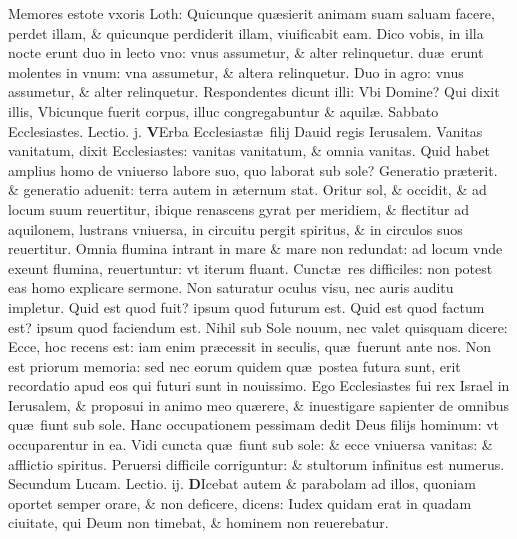 \documentclass[a5paper,10pt]{book}
\def\leftmarginnote{%
	\lrmarginnote{\hskip -\marginparsep \hskip -6.5em}}
\def\ae{æ}
\begin{document}
\begin{multicols*}{2}
Memores estote vxoris Loth: Quicunque qu\ae sierit animam suam saluam facere, perdet illam, \& quicunque perdiderit illam, viuificabit eam.
Dico vobis, in illa nocte erunt duo in lecto vno: vnus assumetur, \& alter relinquetur. du\ae \ erunt molentes in vnum: vna assumetur, \& altera relinquetur. Duo in agro: vnus assumetur, \& alter relinquetur.
Respondentes dicunt illi: Vbi Domine? Qui dixit illis, Vbicunque fuerit corpus, illuc congregabuntur \& aquil\ae .
\newline {} \color{red} \hypertarget{SAT-SECVNDA-POST-ADV}{Sabbato} Ecclesiastes. \hfill Lectio. j. \color{black}
\vspace{-1.25em}
\lettrine[lines=2]{\bfseries V}{}Erba Ecclesiast\ae \ filij Dauid regis Ierusalem. Vanitas vanitatum, dixit Ecclesiastes: vanitas vanitatum, \& omnia vanitas.
Quid habet amplius homo de vniuerso labore suo, quo laborat sub sole? Generatio pr\ae terit. \& generatio aduenit: terra autem in \ae ternum stat.
Oritur sol, \& occidit, \& ad locum suum reuertitur, ibique renascens gyrat per meridiem, \& flectitur ad aquilonem, lustrans vniuersa, in circuitu pergit spiritus, \& in circulos suos reuertitur.
Omnia flumina intrant in mare \& mare non redundat: ad locum vnde exeunt flumina, reuertuntur: vt iterum fluant.
Cunct\ae \ res difficiles: non potest eas homo explicare sermone. Non saturatur oculus visu, nec auris auditu impletur.
Quid est quod fuit? ipsum quod futurum est. Quid est quod factum est? ipsum quod faciendum est. Nihil sub Sole nouum, nec valet quisquam dicere: Ecce, hoc recens est: iam enim pr\ae cessit in seculis, qu\ae \ fuerunt ante nos.
Non est priorum memoria: sed nec eorum quidem qu\ae \ postea futura sunt, erit recordatio apud eos qui futuri sunt in nouissimo.
Ego Ecclesiastes fui rex Israel in Ierusalem, \& proposui in animo meo qu\ae rere, \& inuestigare sapienter de omnibus qu\ae \ fiunt sub sole.
Hanc occupationem pessimam dedit Deus filijs hominum: vt
occuparentur in ea.
Vidi cuncta qu\ae \ fiunt sub sole: \& ecce vniuersa vanitas: \& afflictio spiritus. Peruersi difficile corriguntur: \& stultorum infinitus est numerus.
\newline \color{red} Secundum Lucam. \hfill Lectio. ij. \color{black}
\vspace{-.25em}
\lettrine[lines=2]{\bfseries \color{red} D}{}Icebat\leftmarginnote{\begin{flushright}c. 18.\end{flushright}} autem \& parabolam ad illos, quoniam oportet semper orare, \& non deficere, dicens: Iudex quidam erat in quadam ciuitate, qui Deum non timebat, \& hominem non reuerebatur.

\end{multicols*}
\end{document}
